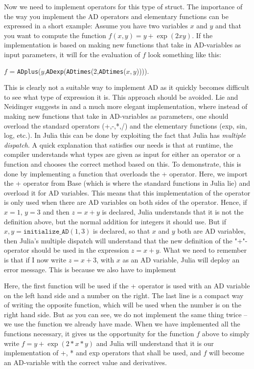 Now we need to implement operators for this type of struct. The importance of the way you implement the AD operators and elementary functions can be expressed in a short example: Assume you have two variables $x$ and $y$ and that you want to compute the function $f(x,y) = y+\exp(2xy)$. If the implementation is based on making new functions that take in AD-variables as input parameters, it will for the evaluation of $f$ look something like this: 
\begin{center}
    $f$ = \texttt{ADplus}($y$,\texttt{ADexp}(\texttt{ADtimes}(2,\texttt{ADtimes}($x,y$)))).
\end{center}
This is clearly not a suitable way to implement AD as it quickly becomes difficult to see what type of expression it is. This approach should be avoided. Lie and Neidinger suggests in \emph{\cite{lieMrstUrl}} and \emph{\cite{doi:10.1137/080743627}} a much more elegant implementation, where instead of making new functions that take in AD-variables as parameters, one should overload the standard operators (+,-,*,/) and the elementary functions (exp, sin, log, etc.). In Julia this can be done by exploiting the fact that Julia has \emph{multiple dispatch}. A quick explanation that satisfies our needs is that at runtime, the compiler understands what types are given as input for either an operator or a function and chooses the correct method based on this. To demonstrate, this is done by implementing a function  
that overloads the + operator. Here, we import the + operator from Base (which is where the standard functions in Julia lie) and overload it for AD variables. This means that this implementation of the operator is only used when there are AD variables on both sides of the operator. Hence, if $x = 1$, $y = 3$ and then $z = x+y$ is declared, Julia understands that it is not the definition above, but the normal addition for integers it should use. But if $x,y = \texttt{initialize\_AD}(1,3)$ is declared, so that $x$ and $y$ both are AD variables, then Julia's multiple dispatch will understand that the new definition of the "+"-operator should be used in the expression $z = x+y$. What we need to remember is that if I now write $z = x + 3$, with $x$ as an AD variable, Julia will deploy an error message. This is because we also have to implement

Here, the first function will be used if the + operator is used with an AD variable on the left hand side and a number on the right. The last line is a compact way of writing the opposite function, which will be used when the number is on the right hand side. But as you can see, we do not implement the same thing twice -- we use the function we already have made. When we have implemented all the functions necessary, it gives us the opportunity for the function $f$ above to simply write $f = y+\exp(2*x*y)$ and Julia will understand that it is our implementation of +, * and exp operators that shall be used, and $f$ will become an AD-variable with the correct value and derivatives. 

